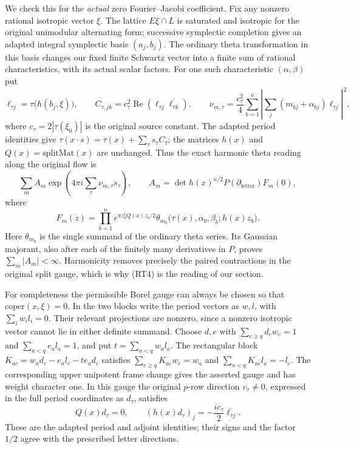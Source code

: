 We check this for the \emph{actual} zero Fourier--Jacobi coefficient.
Fix any nonzero rational isotropic vector $\xi$.  The lattice
$E\xi\cap L$ is saturated and isotropic for the original unimodular
alternating form; successive symplectic completion gives an adapted
integral symplectic basis $(a_j,b_j)$.  The ordinary theta transformation
in this basis changes our fixed finite Schwartz vector into a finite
sum of rational characteristics, with its actual scalar factors.
For one such characteristic $(\alpha,\beta)$ put
\[
 \ell_{\tau j}=\tau\bigl(h(b_j,\xi)\bigr),\qquad
 C_{\tau,jk}=c_\tau^2\operatorname{Re}
                  (\ell_{\tau j}\overline{\ell_{\tau k}}),\qquad
 \nu_{m,\tau}=\frac{c_\tau^2}{4}
       \sum_{b=1}^n\left|\sum_j(m_{bj}+\alpha_{bj})\ell_{\tau j}\right|^2,
                                                        \tag{RT3}
\]
where $c_\tau=2|\tau(\xi_0)|$ is the original source constant.
The adapted period identities give
$\tau(x\cdot s)=\tau(x)+\sum_\tau s_\tau C_\tau$;
the matrices $h(x)$ and $Q(x)=\mathrm{splitMat}(x)$ are unchanged.
Thus the exact harmonic theta reading along the original flow is
\[
 \sum_m A_m\exp\left(4\pi i\sum_\tau\nu_{m,\tau}s_\tau\right),
 \qquad
 A_m=\det h(x)^{n/2}P(\partial_{\mathrm{letter}})F_m(0),
                                                        \tag{RT4}
\]
where
\[
 F_m(z)=\prod_{b=1}^n
       e^{\pi z_b^tQ(x)z_b/2}
       \theta_{m_b}\bigl(\tau(x),\alpha_b,\beta_b;h(x)z_b\bigr).
\]
Here $\theta_{m_b}$ is the single summand of the ordinary theta
series.  Its Gaussian majorant, also after each of the finitely many
derivatives in $P$, proves $\sum_m|A_m|<\infty$.
Harmonicity removes precisely the paired contractions in the original
split gauge, which is why \textup{(RT4)} is the reading of our section.

For completeness the permissible Borel gauge can always be chosen so
that $\mathrm{coper}(x,\xi)=0$.  In the two blocks write the period
vectors as $w,l$, with $\sum_iw_il_i=0$.
Their relevant projections are nonzero, since a nonzero isotropic
vector cannot lie in either definite summand.  Choose $d,e$ with
$\sum_{c\ge q}d_cw_c=1$ and $\sum_{a<q}e_al_a=1$, and put
$t=\sum_{a<q}w_al_a$.
The rectangular block
$K_{ac}=w_ad_c-e_al_c-te_ad_c$ satisfies
$\sum_{c\ge q}K_{ac}w_c=w_a$ and
$\sum_{a<q}K_{ac}l_a=-l_c$.
The corresponding upper unipotent frame change gives the asserted
gauge and has weight character one.
In this gauge the original $p$-row direction $v_\tau\ne0$, expressed
in the full period coordinates as $d_\tau$, satisfies
\[
       Q(x)d_\tau=0,\qquad
       (h(x)d_\tau)_j=-\frac{i c_\tau}{2}
                                      \overline{\ell_{\tau j}}.
                                                        \tag{RT5}
\]
These are the adapted period and adjoint identities; their signs and
the factor $1/2$ agree with the prescribed letter directions.

